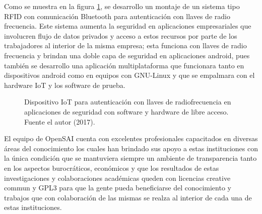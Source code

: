 \documentclass[jou]{apa6} %
\begin{document}
\bigskip

Como se muestra en la figura \ref{fig:IoT2},  se desarrollo un montaje de un sistema tipo RFID con comunicación Bluetooth para autenticación con llaves de radio frecuencia. Este sistema  aumenta la seguridad en aplicaciones empresariales que involucren flujo de datos privados y acceso a estos recursos por parte de los trabajadores al interior de la misma empresa; esta funciona con llaves de radio frecuencia y brindan una doble capa de seguridad en aplicaciones android, pues también se desarrollo una aplicación multiplataforma que funcionara tanto en dispositivos android como en equipos con GNU-Linux y que se empalmara con el hardware IoT y los software de prueba.

\begin{figure}[htb]
  \centering
\setlength\fboxsep{0pt}
\setlength\fboxrule{0.5pt}
  \caption{\footnotesize Dispositivo IoT para autenticación con llaves de radiofrecuencia en aplicaciones de seguridad con software y hardware de libre acceso. Fuente el autor (2017).}
  \label{fig:IoT2}  
\end{figure}

El equipo de OpenSAI cuenta con excelentes profesionales capacitados en diversas áreas del conocimiento los cuales han brindado sus apoyo a estas instituciones con la única condición que se mantuviera siempre un ambiente de transparencia tanto en los aspectos burocráticos, económicos y que los resultados de estas investigaciones y colaboraciones académicas queden con licencias creative commun y GPL3 para que la gente pueda beneficiarse del conocimiento y trabajos que con colaboración de las mismas se realza al interior de cada una de estas instituciones.  

\newpage
\end{document}
